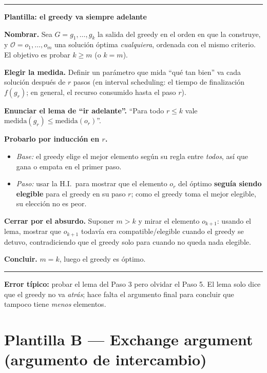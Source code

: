 \documentclass[11pt,a4paper]{article}
\theoremstyle{plain}
\theoremstyle{definition}
\theoremstyle{remark}
\newenvironment{plantilla}[1]{\par\medskip\noindent
  \begin{minipage}{\textwidth}\hrule\vspace{3pt}
  \noindent\textbf{Plantilla: #1}\par\smallskip}
  {\vspace{2pt}\hrule\end{minipage}\par\medskip}
\begin{document}
\begin{plantilla}{el greedy va siempre adelante}
\begin{pasos}
\item \textbf{Nombrar.} Sea $G=g_1,\dots,g_k$ la salida del greedy en el orden en que la
construye, y $\mathcal{O}=o_1,\dots,o_m$ una solución óptima \emph{cualquiera}, ordenada
con el mismo criterio. El objetivo es probar $k\ge m$ (o $k=m$).
\item \textbf{Elegir la medida.} Definir un parámetro que mida ``qué tan bien'' va cada
solución después de $r$ pasos (en interval scheduling: el tiempo de finalización
$f(g_r)$; en general, el recurso consumido hasta el paso $r$).
\item \textbf{Enunciar el lema de ``ir adelante''.} ``Para todo $r\le k$ vale
$\mathrm{medida}(g_r)\le \mathrm{medida}(o_r)$''.
\item \textbf{Probarlo por inducción en $r$.}
  \begin{itemize}
  \item \emph{Base:} el greedy elige el mejor elemento según su regla entre \emph{todos},
        así que gana o empata en el primer paso.
  \item \emph{Paso:} usar la H.I.\ para mostrar que el elemento $o_r$ del óptimo
        \textbf{seguía siendo elegible} para el greedy en su paso $r$; como el greedy
        toma el mejor elegible, su elección no es peor.
  \end{itemize}
\item \textbf{Cerrar por el absurdo.} Suponer $m>k$ y mirar el elemento $o_{k+1}$:
usando el lema, mostrar que $o_{k+1}$ todavía era compatible/elegible cuando el greedy
se detuvo, contradiciendo que el greedy solo para cuando no queda nada elegible.
\item \textbf{Concluir.} $m=k$, luego el greedy es óptimo.
\end{pasos}
\end{plantilla}

\noindent\textbf{Error típico:} probar el lema del Paso 3 pero olvidar el Paso 5. El
lema solo dice que el greedy no va \emph{atrás}; hace falta el argumento final para
concluir que tampoco tiene \emph{menos} elementos.

\section{Plantilla B --- Exchange argument (argumento de intercambio)}
\end{document}
